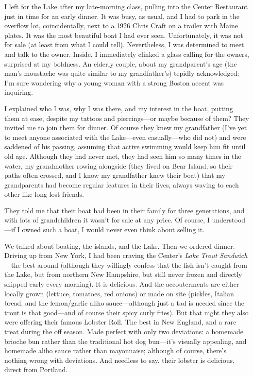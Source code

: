I left for the Lake after my late-morning class, pulling into the Center
Restaurant just in time for an early dinner. It was busy, as usual, and
I had to park in the overflow lot, coincidentally, next to a 1926 Chris
Craft on a trailer with Maine plates. It was the most beautiful boat I
had ever seen. Unfortunately, it was not for sale (at least from what I
could tell). Nevertheless, I was determined to meet and talk to the
owner. Inside, I immediately clinked a glass calling for the owners,
surprised at my boldness. An elderly couple, about my grandparent's age
(the man's moustache was quite similar to my grandfather's) tepidly
acknowledged; I'm sure wondering why a young woman with a strong Boston
accent was inquiring.

I explained who I was, why I was there, and my interest in the boat,
putting them at ease, despite my tattoos and piercings---or maybe
because of them? They invited me to join them for dinner. Of course they
knew my grandfather (I've yet to meet anyone associated with the
Lake---even casually---who did not) and were saddened of his passing,
assuming that active swimming would keep him fit until old age. Although
they had never met, they had seen him so many times in the water, my
grandmother rowing alongside (they lived on Bear Island, so their paths
often crossed, and I know my grandfather knew their boat) that my
grandparents had become regular features in their lives, always waving
to each other like long-lost friends.

They told me that their boat had been in their family for three
generations, and with lots of grandchildren it wasn't for sale at any
price. Of course, I understood---if I owned such a boat, I would never
even think about selling it.

We talked about boating, the islands, and the Lake. Then we ordered
dinner. Driving up from New York, I had been craving the Center's
\emph{Lake Trout Sandwich}---the best around (although they willingly
confess that the fish isn't caught from the Lake, but from northern New
Hampshire, but still never frozen and directly shipped early every
morning). It is delicious. And the accouterments are either locally
grown (lettuce, tomatoes, red onions) or made on site (pickles, Italian
bread, and the lemon/garlic aliho sauce---although just a tad is needed
since the trout is that good---and of course their spicy curly fries).
But that night they also were offering their famous Lobster Roll. The
best in New England, and a rare treat during the off season. Made
perfect with only two deviations: a homemade brioche bun rather than the
traditional hot dog bun---it's visually appealing, and homemade aliho
sauce rather than mayonnaise; although of course, there's nothing wrong
with deviations. And needless to say, their lobster is delicious, direct
from Portland.

